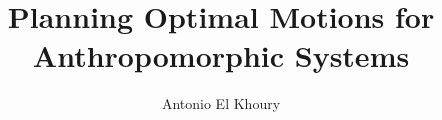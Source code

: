 \documentclass[a4paper,twoside,openright,11pt]{book}
\begin{document}

%
%
%
%
\frontmatter
\author{Antonio El Khoury}
\title{Planning Optimal Motions for Anthropomorphic Systems}

%
%
%
\tableofcontents{\thispagestyle{headings}}


%
\mainmatter
\pagestyle{empty}

\pagestyle{fancy}
\renewcommand{\headrulewidth}{0pt}
\fancyhf{}
\fancyhead[LE]{\leftmark} %
\fancyhead[RE]{\thepage} %
\fancyhead[LO]{\rightmark} %
\fancyhead[RO]{\thepage} %
\fancyfootoffset[RO]{\marginparwidth - \marginparsep}







\appendices


\backmatter

%
\begin{singlespace}

\end{singlespace}
%
\end{document}
